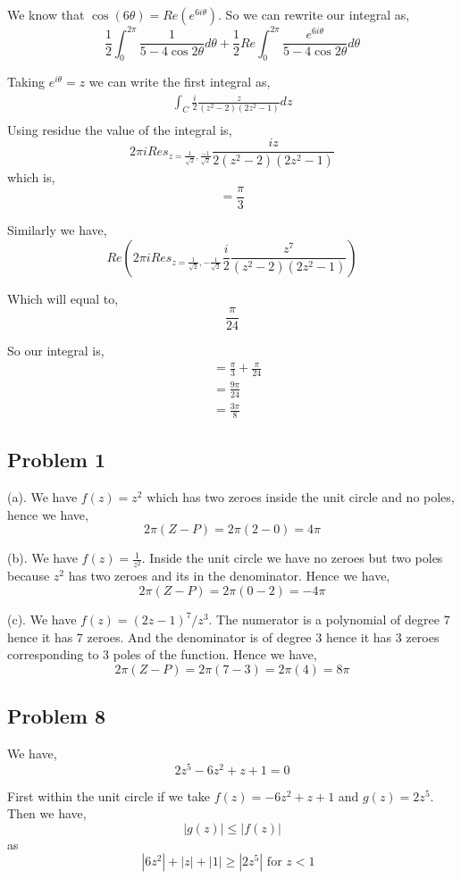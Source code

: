 \documentclass[a4paper]{report}
\begin{document}
We know that $\cos(6\theta) = Re (e^{6i\theta})$. So we can rewrite our integral as, 
$$ \frac{1}{2}\int_0^{2\pi} \frac{1}{5 - 4 \cos 2\theta} d\theta + \frac{1}{2}Re \int_0^{2\pi} \frac{e^{6i\theta}}{5 - 4 \cos 2\theta} d\theta $$ 

Taking $e^{i\theta} = z$ we can write the first integral as,
\begin{align*}
    \int_{C } \frac{i}{2}      \frac{z}{(z^2 - 2)(2z^2 - 1)} dz\\
\end{align*}
Using residue the value of the integral is, 
$$ 2\pi i Res_{z = \frac{1}{\sqrt{2}}, \frac{-1}{\sqrt{2}}} \frac{iz}{2(z^2 - 2)(2z^2 - 1)} $$ 
which is, 
$$ = \frac{\pi}{3}$$

Similarly we have, 
$$ Re( 2\pi i Res_{z = \frac{1}{\sqrt{2}},-\frac{1}{\sqrt{2}}}  \frac{i}{2} \frac{z^{7}}{(z^2 - 2)(2z^2 - 1)} )$$ 

Which will equal to, 
$$ \frac{\pi}{24} $$ 

So our integral is, 
\begin{align*}
&= \frac{\pi}{3} + \frac{\pi}{24}\\
&= \frac{9\pi}{24}\\
&= \frac{3\pi}{8}
\end{align*}


\subsection*{Problem 1}
(a). We have $f(z) = z^2$ which has two zeroes inside the unit circle and no poles, hence we have, 
$$ 2\pi (Z - P) = 2\pi (2 - 0) = 4\pi $$ 

(b). We have $f(z) = \frac{1}{z^2}$. Inside the unit circle we have no zeroes but two poles because $z^2$ has two zeroes and its in the denominator. Hence we have, 
$$ 2\pi (Z - P) = 2\pi (0 - 2) = -4\pi $$ 

(c). We have $f(z) = (2z - 1)^{7} / z^{3}$. The numerator is a polynomial of degree 7 hence it has 7 zeroes. And the denominator is of degree 3 hence it has 3 zeroes corresponding to 3 poles of the function. Hence we have, 
$$ 2\pi (Z - P) = 2\pi (7 - 3) = 2\pi (4) = 8\pi $$ 

\subsection*{Problem 8}
We have, 
$$ 2z^{5} - 6z^2 + z + 1 = 0$$

First within the unit circle if we take $f(z) = -6z^2 + z + 1$ and $g(z) = 2z^{5}$. Then we have, 
$$ |g(z)| \le |f(z)| $$ as 
$$ |6z^2| + |z| + |1| \ge |2z^{5}| \text{ for $z < 1$ } $$ 
\end{document}
